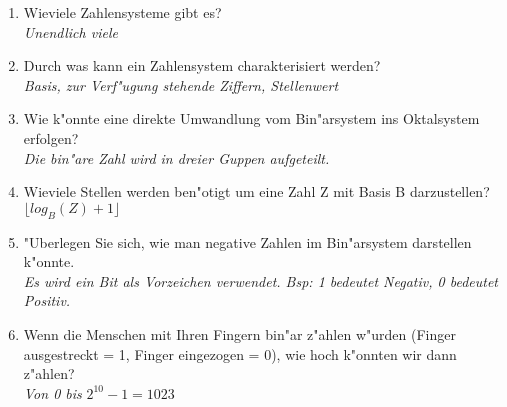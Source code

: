 \documentclass[a4paper,10pt]{article}
\begin{document}
\begin{enumerate}
\item Wieviele Zahlensysteme gibt es?\\
\emph{Unendlich viele}
\item Durch was kann ein Zahlensystem charakterisiert werden?\\
\emph{Basis, zur Verf"ugung stehende Ziffern, Stellenwert}
\item Wie k"onnte eine direkte Umwandlung vom Bin"arsystem ins Oktalsystem erfolgen?\\
\emph{Die bin"are Zahl wird in dreier Guppen aufgeteilt.}
\item Wieviele Stellen werden ben"otigt um eine Zahl Z mit Basis B darzustellen?\\
$\lfloor log_B(Z) + 1 \rfloor$
\item "Uberlegen Sie sich, wie man negative Zahlen im Bin"arsystem darstellen k"onnte.\\
\emph{Es wird ein Bit als Vorzeichen verwendet. Bsp: 1 bedeutet Negativ, 0 bedeutet Positiv.}
\item Wenn die Menschen mit Ihren Fingern bin"ar z"ahlen w"urden (Finger ausgestreckt = 1, Finger eingezogen = 0), wie hoch k"onnten wir dann z"ahlen?\\
\emph{Von 0 bis} $2^{10}-1 = 1023$
\end{enumerate}
\end{document}
